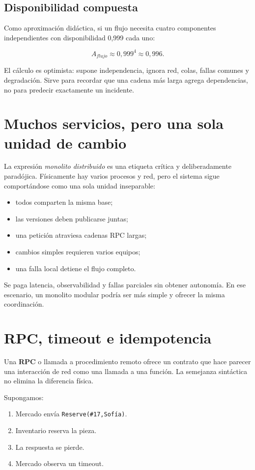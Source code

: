 \documentclass[variant=apuntes,cover=institutional,mode=screen]{ua-engineering-v6-article}
\begin{document}
\subsection{Disponibilidad compuesta}

Como aproximación didáctica, si un flujo necesita cuatro componentes independientes con disponibilidad 0,999 cada uno:

\[
A_{flujo}\approx 0{,}999^4\approx 0{,}996.
\]

El cálculo es optimista: supone independencia, ignora red, colas, fallas comunes y degradación. Sirve para recordar que una cadena más larga agrega dependencias, no para predecir exactamente un incidente.

\section{Muchos servicios, pero una sola unidad de cambio}

La expresión \emph{monolito distribuido} es una etiqueta crítica y deliberadamente paradójica. Físicamente hay varios procesos y red, pero el sistema sigue comportándose como una sola unidad inseparable:

\begin{itemize}
\item todos comparten la misma base;
\item las versiones deben publicarse juntas;
\item una petición atraviesa cadenas RPC largas;
\item cambios simples requieren varios equipos;
\item una falla local detiene el flujo completo.
\end{itemize}

Se paga latencia, observabilidad y fallas parciales sin obtener autonomía. En ese escenario, un monolito modular podría ser más simple y ofrecer la misma coordinación.

\section{RPC, timeout e idempotencia}

Una \textbf{RPC} o llamada a procedimiento remoto ofrece un contrato que hace parecer una interacción de red como una llamada a una función. La semejanza sintáctica no elimina la diferencia física.

Supongamos:

\begin{enumerate}
\item Mercado envía \texttt{Reserve(\#17,Sofía)}.
\item Inventario reserva la pieza.
\item La respuesta se pierde.
\item Mercado observa un timeout.
\end{enumerate}
\end{document}
